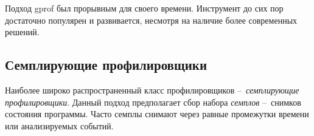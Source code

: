 Подход gprof был прорывным для своего времени.
Инструмент до сих пор достаточно популярен и развивается, несмотря на наличие более современных решений.



\subsection{Семплирующие профилировщики}
Наиболее широко распространенный класс профилировщиков – \textit{семплирующие профилировщики}.
Данный подход предполагает сбор набора \textit{семплов} – снимков состояния программы.
Часто семплы снимают через равные промежутки времени или анализируемых событий.





